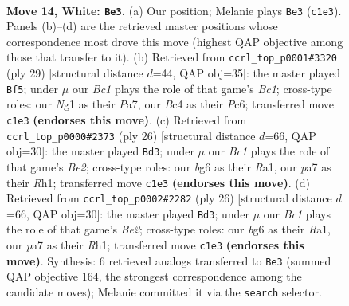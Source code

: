 \documentclass[11pt]{article}
\begin{document}
\clearpage

\begin{figure}[p]\centering
\begin{subfigure}{0.46\textwidth}\centering
\resizebox{\linewidth}{!}{%
\newchessgame
\chessboard[
  setfen={r3kbnr/p1n3p1/6bp/4pp2/2B4P/6NR/PP3PP1/R1BK2N1 w kq - 0 14},
  showmover=false,
  pgfstyle=straightmove, color=movearrow, markmove={c1-e3}
]}
\caption{}
\end{subfigure}\hfill
\begin{subfigure}{0.46\textwidth}\centering
\resizebox{\linewidth}{!}{%
\newchessgame
\chessboard[
  setfen={r1b1k2r/pp3ppp/2pb4/3n4/5P2/3N2PP/PPPBB3/R3K2R b KQkq - 0 15},
  showmover=false,
  pgfstyle=straightmove, color=movearrow, markmove={c8-f5}
]}
\caption{}
\end{subfigure}
\\[4pt]
\begin{subfigure}{0.46\textwidth}\centering
\resizebox{\linewidth}{!}{%
\newchessgame
\chessboard[
  setfen={r1br2k1/4bppp/p1p2n2/4p3/4P3/P1N1B3/1PP1B1PP/R3K2R w KQ - 0 14},
  showmover=false,
  pgfstyle=straightmove, color=movearrow, markmove={e2-d3}
]}
\caption{}
\end{subfigure}\hfill
\begin{subfigure}{0.46\textwidth}\centering
\resizebox{\linewidth}{!}{%
\newchessgame
\chessboard[
  setfen={r1br2k1/4bppp/p1p2n2/4p3/4P3/P1N1B3/1PP1B1PP/R3K2R w KQ - 0 14},
  showmover=false,
  pgfstyle=straightmove, color=movearrow, markmove={e2-d3}
]}
\caption{}
\end{subfigure}
\caption{\textbf{Move 14, White: \texttt{Be3}.} (a) Our position; Melanie plays \texttt{Be3} (\texttt{c1e3}). Panels (b)--(d) are the retrieved master positions whose correspondence most drove this move (highest QAP objective among those that transfer to it). (b) Retrieved from \texttt{ccrl\_top\_p0001\#3320} (ply 29) [structural distance $d$=44, QAP obj=35]: the master played \texttt{Bf5}; under $\mu$ our \emph{Bc1} plays the role of that game's \emph{Bc1}; cross-type roles: our \emph{N}g1 as their \emph{P}a7, our \emph{B}c4 as their \emph{P}c6; transferred move \texttt{c1e3} \textbf{(endorses this move)}. (c) Retrieved from \texttt{ccrl\_top\_p0000\#2373} (ply 26) [structural distance $d$=66, QAP obj=30]: the master played \texttt{Bd3}; under $\mu$ our \emph{Bc1} plays the role of that game's \emph{Be2}; cross-type roles: our \emph{b}g6 as their \emph{R}a1, our \emph{p}a7 as their \emph{R}h1; transferred move \texttt{c1e3} \textbf{(endorses this move)}. (d) Retrieved from \texttt{ccrl\_top\_p0002\#2282} (ply 26) [structural distance $d$=66, QAP obj=30]: the master played \texttt{Bd3}; under $\mu$ our \emph{Bc1} plays the role of that game's \emph{Be2}; cross-type roles: our \emph{b}g6 as their \emph{R}a1, our \emph{p}a7 as their \emph{R}h1; transferred move \texttt{c1e3} \textbf{(endorses this move)}. Synthesis: 6 retrieved analogs transferred to \texttt{Be3} (summed QAP objective 164, the strongest correspondence among the candidate moves); Melanie committed it via the \texttt{search} selector.}
\label{fig:thought-m26}
\end{figure}
\end{document}
